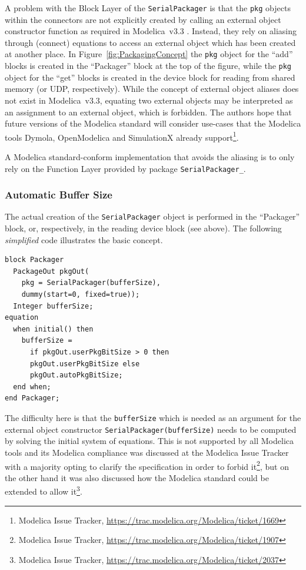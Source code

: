 \documentclass{resources/modelica}
\newcommand{\modelica}[1]{\lstinline[language=modelica]|#1|}
\begin{document}
A problem with the \textsf{Block Layer} of the \modelica{SerialPackager} is that the \modelica{pkg}
objects within the connectors are not explicitly created by calling an external object constructor
function as required in Modelica~v3.3 \cite[p.\@~165]{ModelicaAssociation2014}.
Instead, they rely on aliasing through (connect) equations to
access an external object which has been created at another place. In
Figure~\ref{fig:PackagingConcept} the \modelica{pkg} object for the ``add''
blocks is created in the ``Packager'' block at the top of the figure, while the
\modelica{pkg} object for the ``get'' blocks is created in the device block for reading from
shared memory (or UDP, respectively). While the concept of external object
aliases does not exist in Modelica~v3.3, equating two external
objects may be interpreted as an assignment to an external object,
which is forbidden. The authors hope that future versions of
the Modelica standard will consider use-cases that the
Modelica tools Dymola, OpenModelica and SimulationX already support\footnote{Modelica Issue Tracker,
\url{https://trac.modelica.org/Modelica/ticket/1669}}.

A Modelica standard-conform implementation that avoids the aliasing is to only rely on the \textsf{Function Layer} provided by package \modelica{SerialPackager_}.

\subsubsection{Automatic Buffer Size}
\label{sec:Automatic Buffer Size}

The actual creation of the \modelica{SerialPackager} object is performed in
the ``Packager'' block, or, respectively, in the reading device block (see
above). The following \emph{simplified} code illustrates the basic concept.
\begin{lstlisting}[language=modelica]
block Packager
  PackageOut pkgOut(
    pkg = SerialPackager(bufferSize),
    dummy(start=0, fixed=true));
  Integer bufferSize;
equation
  when initial() then
    bufferSize =
      if pkgOut.userPkgBitSize > 0 then
      pkgOut.userPkgBitSize else
      pkgOut.autoPkgBitSize;
  end when;
end Packager;
\end{lstlisting}
The difficulty here is that the \modelica{bufferSize} which is needed as an
argument for the external object constructor
\modelica{SerialPackager(bufferSize)} needs to be computed by solving the
initial system of equations. This is not supported by all Modelica tools and its
Modelica compliance was discussed at the Modelica Issue Tracker with a majority
opting to clarify the specification in order to forbid it\footnote{Modelica Issue Tracker,
\url{https://trac.modelica.org/Modelica/ticket/1907}}, but on the other hand
it was also discussed how the Modelica standard could be extended to allow
it\footnote{Modelica Issue Tracker,
\url{https://trac.modelica.org/Modelica/ticket/2037}}.
\end{document}
